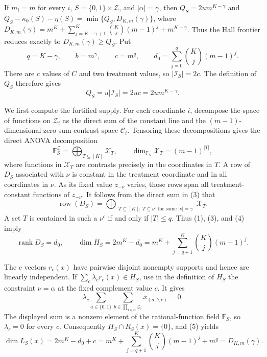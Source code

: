 If \(m_i=m\) for every \(i\), \(S=\{0,1\}\times\mathcal Z\), and \(|\alpha|=\gamma\), then \(Q_S=2u m^{K-\gamma}\) and \(Q_S-\kappa_0(S)-\eta(S)=\min\{Q_S,D_{K,m}(\gamma)\}\), where \(D_{K,m}(\gamma)=m^K+\sum_{j=K-\gamma+1}^K\binom Kj(m-1)^j+m^{K-\gamma}\). Thus the Hall frontier reduces exactly to \(D_{K,m}(\gamma)\ge Q_S\).
Put
\[
q=K-\gamma,\qquad b=m^\gamma,\qquad c=m^q,
\qquad
d_0=\sum_{j=0}^{q}\binom Kj(m-1)^j.
\tag{1}
\]
There are \(c\) values of \(C\) and two treatment values, so
\(\lvert\mathcal I_S\rvert=2c\).  The definition of \(Q_S\) therefore gives
\[
Q_S=u\lvert\mathcal I_S\rvert=2uc=2u m^{K-\gamma}.
\tag{2}
\]

We first compute the fortified supply.  For each coordinate \(i\), decompose the
space of functions on \(\mathcal Z_i\) as the direct sum of the constant line and
the \((m-1)\)-dimensional zero-sum contrast space \(\mathscr C_i\).  Tensoring
these decompositions gives the direct ANOVA decomposition
\[
\mathbb F_S^{\mathcal Z}
=\bigoplus_{T\subseteq[K]}\mathscr X_T,
\qquad
\dim_{\mathbb F_S}\mathscr X_T=(m-1)^{\lvert T\rvert},
\tag{3}
\]
where functions in \(\mathscr X_T\) are contrasts precisely in the coordinates
in \(T\).  A row of \(D_S\) associated with \(\nu\) is constant in the treatment
coordinate and in all coordinates in \(\nu\).  As its fixed value
\(z_{-\nu}\) varies, those rows span all treatment-constant functions of
\(z_{-\nu}\).  It follows from the direct sum in (3) that
\[
\operatorname{row}(D_S)
=\bigoplus_{\substack{T\subseteq[K]:\ T\subseteq\nu^c
\text{ for some }\lvert\nu\rvert=\gamma}}
\mathscr X_T.
\tag{4}
\]
A set \(T\) is contained in such a \(\nu^c\) if and only if
\(\lvert T\rvert\le q\).  Thus (1), (3), and (4) imply
\[
\operatorname{rank}D_S=d_0,
\qquad
\dim H_S=2m^K-d_0
=m^K+\sum_{j=q+1}^{K}\binom Kj(m-1)^j.
\tag{5}
\]

The \(c\) vectors \(r_c(x)\) have pairwise disjoint nonempty supports and hence
are linearly independent.  If
\(\sum_c\lambda_c r_c(x)\in H_S\), use in the definition of \(H_S\) the
constraint \(\nu=\alpha\) at the fixed complement value \(c\).  It gives
\[
\lambda_c\sum_{a\in\{0,1\}}\sum_{b\in\prod_{i\in\alpha}\mathcal Z_i}
x_{(a,b,c)}=0.
\tag{6}
\]
The displayed sum is a nonzero element of the rational-function field
\(\mathbb F_S\), so \(\lambda_c=0\) for every \(c\).  Consequently
\(H_S\cap R_S(x)=\{0\}\), and (5) yields
\[
\dim L_S(x)=2m^K-d_0+c
=m^K+\sum_{j=q+1}^{K}\binom Kj(m-1)^j+m^q
=D_{K,m}(\gamma).
\tag{7}
\]

